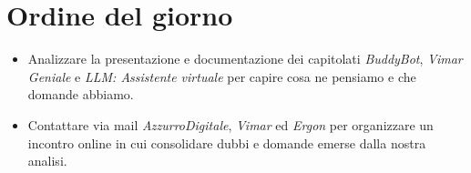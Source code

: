 \section{Ordine del giorno}

\begin{itemize}
    \item Analizzare la presentazione e documentazione dei capitolati \emph{BuddyBot}, \emph{Vimar Geniale} e \emph{LLM: Assistente virtuale} per capire cosa ne pensiamo e che domande abbiamo.
    \item Contattare via mail \emph{AzzurroDigitale}, \emph{Vimar} ed \emph{Ergon} per organizzare un incontro online in cui consolidare dubbi e domande emerse dalla nostra analisi.
\end{itemize}